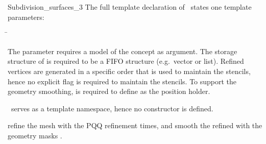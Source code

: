 \begin{ccRefClass}{Subdivision_surfaces_3}
The full template declaration of \ccClassTemplateName\ states one
template parameters:

\begin{tabbing}
 \= 
\end{tabbing}
   
The parameter  requires a model of 
the  concept as argument. The storage structure
of  is required to be a FIFO structure (e.g.~vector or list).
Refined vertices are generated in a specific order that
is used to maintain the stencils, hence no explicit flag is required
to maintain the stencils. To support the geometry smoothing, 
is required to define  as the position holder.








\ccCreation

\ccClassTemplateName\ serves as a template namespace, hence no constructor
is defined. 




\ccThree{}{}{}
{refine the mesh  with the PQQ refinement
 times, and smooth the refined  with the geometry 
masks .}


\end{ccRefClass}

